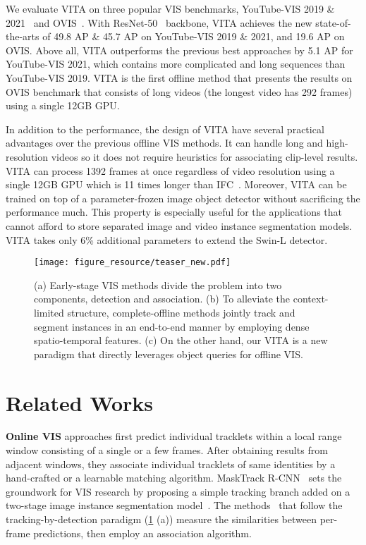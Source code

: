 \documentclass{article}
\begin{document}
We evaluate VITA on three popular VIS benchmarks, YouTube-VIS 2019 \& 2021~\cite{MaskTrackRCNN} and OVIS~\cite{OVIS-Dataset}.
With ResNet-50~\cite{ResNet} backbone, VITA achieves the new state-of-the-arts of 49.8 AP \& 45.7 AP on YouTube-VIS 2019 \& 2021, and 19.6 AP on OVIS.
Above all, VITA outperforms the previous best approaches by 5.1 AP for YouTube-VIS 2021, which contains more complicated and long sequences than YouTube-VIS 2019.
VITA is the first offline method that presents the results on OVIS benchmark that consists of long videos (the longest video has 292 frames) using a single 12GB GPU.

In addition to the performance, the design of VITA have several practical advantages over the previous offline VIS methods.
It can handle long and high-resolution videos so it does not require heuristics for associating clip-level results. 
VITA can process 1392 frames at once regardless of video resolution using a single 12GB GPU which is 11 times longer than IFC~\cite{IFC}.
Moreover, VITA can be trained on top of a parameter-frozen image object detector without sacrificing the performance much. 
This property is especially useful for the applications that cannot afford to store separated image and video instance segmentation models. 
VITA takes only 6\% additional parameters to extend the Swin-L detector.



\begin{figure}
    \centering
    \texttt{[image: figure\_resource/teaser\_new.pdf]}
\caption{
    (a) Early-stage VIS methods divide the problem into two components, detection and association. (b) To alleviate the context-limited structure, complete-offline methods jointly track and segment instances in an end-to-end manner by employing dense spatio-temporal features.
    (c) On the other hand, our VITA is a new paradigm that directly leverages object queries for offline VIS.
    }
    \label{fig:teaser}
\end{figure}
  \section{Related Works}


\label{sec:related}

\textbf{Online VIS } approaches first predict individual tracklets within a local range window consisting of a single or a few frames.
After obtaining results from adjacent windows, they associate individual tracklets of same identities by a hand-crafted or a learnable matching algorithm.
MaskTrack R-CNN~\cite{MaskTrackRCNN} sets the groundwork for VIS research by proposing a simple tracking branch added on a two-stage image instance segmentation model~\cite{MaskRCNN}.
The methods~\cite{SipMask, CrossVIS, SGNet} that follow the tracking-by-detection paradigm (\cref{fig:teaser} (a)) measure the similarities between per-frame predictions, then employ an association algorithm.
\end{document}
